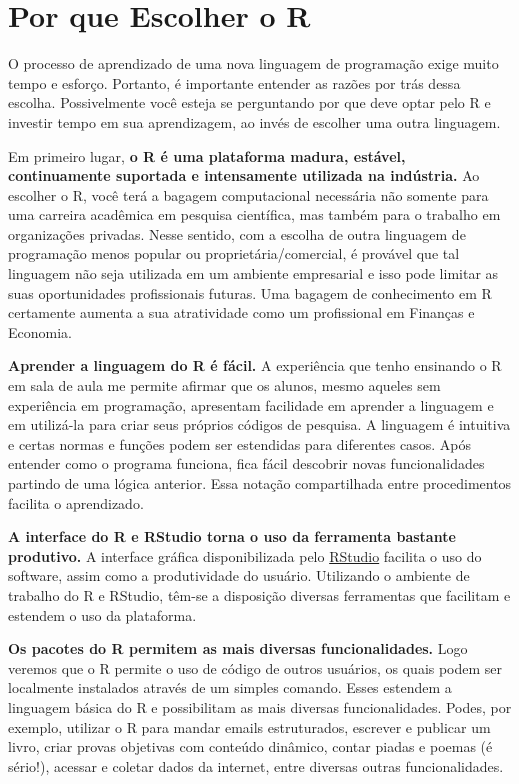 \documentclass[
  11pt,
]{book}
\begin{document}
\hypertarget{por-que-escolher-o-r}{%
\section{Por que Escolher o R}\label{por-que-escolher-o-r}}

O processo de aprendizado de uma nova linguagem de programação exige muito tempo e esforço. Portanto, é importante entender as razões por trás dessa escolha. Possivelmente você esteja se perguntando por que deve optar pelo R e investir tempo em sua aprendizagem, ao invés de escolher uma outra linguagem.

Em primeiro lugar, \textbf{o R é uma plataforma madura, estável, continuamente suportada e intensamente utilizada na indústria.} Ao escolher o R, você terá a bagagem computacional necessária não somente para uma carreira acadêmica em pesquisa científica, mas também para o trabalho em organizações privadas. Nesse sentido, com a escolha de outra linguagem de programação menos popular ou proprietária/comercial, é provável que tal linguagem não seja utilizada em um ambiente empresarial e isso pode limitar as suas oportunidades profissionais futuras. Uma bagagem de conhecimento em R certamente aumenta a sua atratividade como um profissional em Finanças e Economia.

\textbf{Aprender a linguagem do R é fácil.} A experiência que tenho ensinando o R em sala de aula me permite afirmar que os alunos, mesmo aqueles sem experiência em programação, apresentam facilidade em aprender a linguagem e em utilizá-la para criar seus próprios códigos de pesquisa. A linguagem é intuitiva e certas normas e funções podem ser estendidas para diferentes casos. Após entender como o programa funciona, fica fácil descobrir novas funcionalidades partindo de uma lógica anterior. Essa notação compartilhada entre procedimentos facilita o aprendizado.

\textbf{A interface do R e RStudio torna o uso da ferramenta bastante produtivo.} A interface gráfica disponibilizada pelo \href{https://rstudio.com/}{RStudio} facilita o uso do software, assim como a produtividade do usuário. Utilizando o ambiente de trabalho do R e RStudio, têm-se a disposição diversas ferramentas que facilitam e estendem o uso da plataforma.

\textbf{Os pacotes do R permitem as mais diversas funcionalidades.} Logo veremos que o R permite o uso de código de outros usuários, os quais podem ser localmente instalados através de um simples comando. Esses estendem a linguagem básica do R e possibilitam as mais diversas funcionalidades. Podes, por exemplo, utilizar o R para mandar emails estruturados, escrever e publicar um livro, criar provas objetivas com conteúdo dinâmico, contar piadas e poemas (é sério!), acessar e coletar dados da internet, entre diversas outras funcionalidades.
\end{document}
